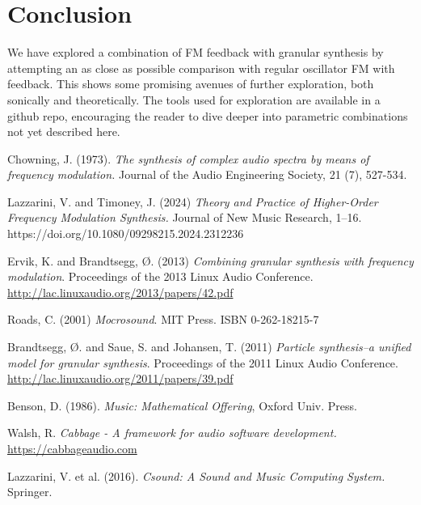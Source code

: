 \documentclass[runningheads,a4paper]{llncs}
\begin{document}
\section{Conclusion}
We have explored a combination of FM feedback with granular synthesis by attempting an as close as possible comparison with regular oscillator FM with feedback. This shows some promising avenues of further exploration, both sonically and theoretically. The tools used for exploration are available in a github repo, encouraging the reader to dive deeper into parametric combinations not yet described here.



\begin{thebibliography}{99}

 Chowning, J. (1973). \emph{The synthesis of complex audio spectra by means of frequency modulation.} Journal of the Audio Engineering Society, 21 (7), 527-534.
	
 Lazzarini, V. and Timoney, J. (2024) \emph{Theory and Practice of Higher-Order Frequency Modulation Synthesis.} Journal of New Music Research, 1–16. https://doi.org/10.1080/09298215.2024.2312236

 Ervik, K. and Brandtsegg, Ø. (2013) \emph{Combining granular synthesis with frequency modulation}. Proceedings of the 2013 Linux Audio Conference. \url{http://lac.linuxaudio.org/2013/papers/42.pdf}

 Roads, C. (2001) \emph{Mocrosound}. MIT Press.  ISBN 0-262-18215-7

 Brandtsegg, Ø. and Saue, S. and Johansen, T. (2011) \emph{Particle synthesis–a unified model for granular synthesis}. Proceedings of the 2011 Linux Audio Conference. \url{http://lac.linuxaudio.org/2011/papers/39.pdf}

 Benson, D. (1986).\emph{ Music: Mathematical Offering}, Oxford Univ. Press.

 Walsh, R. \emph{Cabbage - A framework for audio software development.} \url{https://cabbageaudio.com}

 Lazzarini, V. et al. (2016). \emph{Csound: A Sound and Music Computing System.} Springer.



\end{thebibliography}
\end{document}

